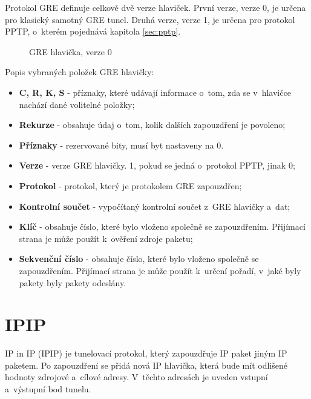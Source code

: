 Protokol GRE definuje celkově dvě verze hlaviček. První verze, verze 0, je určena pro klasický samotný GRE tunel. Druhá verze, verze 1, je určena pro protokol PPTP, o~kterém pojednává kapitola \ref{sec:pptp}.

\begin{figure}[H]
    \centering
    \caption{GRE hlavička, verze 0}
    \label{img:hlavicka_gre}
\end{figure}

Popis vybraných položek GRE hlavičky:

\begin{itemize}
    \item \textbf{C, R, K, S} - příznaky, které udávají informace o~tom, zda se v~hlavičce nachází dané volitelné položky;
    \item \textbf{Rekurze} - obsahuje údaj o~tom, kolik dalších zapouzdření je povoleno;
    \item \textbf{Příznaky} - rezervované bity, musí byt nastaveny na 0.
    \item \textbf{Verze} - verze GRE hlavičky. 1, pokud se jedná o~protokol PPTP, jinak 0;
    \item \textbf{Protokol} - protokol, který je protokolem GRE zapouzdřen;
    \item \textbf{Kontrolní součet} - vypočítaný kontrolní součet z~GRE hlavičky a~dat;
    \item \textbf{Klíč} - obsahuje číslo, které bylo vloženo společně se zapouzdřením. Přijímací strana je může použít k~ověření zdroje paketu;
    \item \textbf{Sekvenční číslo} - obsahuje číslo, které bylo vloženo společně se zapouzdřením. Přijímací strana je může použít k~určení pořadí, v~jaké byly pakety byly pakety odeslány.
\end{itemize}

\section{IPIP}
IP in IP (IPIP) je tunelovací protokol, který zapouzdřuje IP paket jiným IP paketem. Po zapouzdření se přidá nová IP hlavička, která bude mít odlišené hodnoty zdrojové a~cílové adresy. V~těchto adresách je uveden vstupní a~výstupní bod tunelu.

